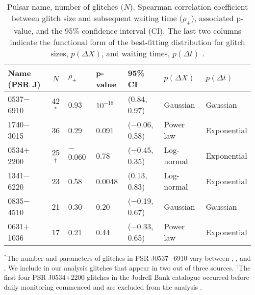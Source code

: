 \begin{table*}
	\caption{Pulsar name, number of glitches ($N$), Spearman correlation coefficient between glitch size and subsequent waiting time ($\rho_+$), associated p-value, and the 95\% confidence interval (CI). The last two columns indicate the functional form of the best-fitting distribution for glitch sizes, $p(\Delta X)$, and waiting times, $p(\Delta t)$ \citep{Melatos2008, Howitt2018, Fuentes2019}.}
	\begin{center}
		\begin{tabular}{l c l l l l l}
		\toprule
		Name (PSR J) 	& $N$ &  {$\rho_+$}	& p-value & 95\% CI & $p(\Delta X)$ & $p(\Delta t)$\\
		\midrule
		0537$-$6910  & 42$^*$ & 0.93  & $10^{-18}$  & (0.84, 0.97) & Gaussian & Gaussian \\
		1740$-$3015  & 36 & 0.29  & 0.091 & ($-$0.06, 0.58) & Power law & Exponential \\
		0534$+$2200  & 25$^\dagger$ & $-$0.060 & 0.78  & ($-$0.45, 0.35) & Log-normal & Exponential \\
		1341$-$6220  & 23 & 0.58  & 0.0048  & (0.13, 0.83) & Log-normal & Exponential \\
		0835$-$4510  & 21 & 0.30  & 0.20  & ($-$0.19, 0.67) & Gaussian & Gaussian \\
		0631$+$1036  & 17 & 0.21  & 0.44  & ($-$0.33, 0.65) & Power law & Exponential\\
		\bottomrule
		\end{tabular}
	\end{center}
	\label{tab:bsa_data}
	$^*$The number and parameters of glitches in PSR J0537$-$6910 vary between \citet{Middleditch2006}, \citet{Antonopoulou2018}, and \citet{Ferdman2018}. We include in our analysis glitches that appear in two out of three sources.
	\newline$^\dagger$The first four PSR J0534$+$2200 glitches in the Jodrell Bank catalogue occurred before daily monitoring commenced and are excluded from the analysis \citep{Lyne2015}.
\end{table*}	

